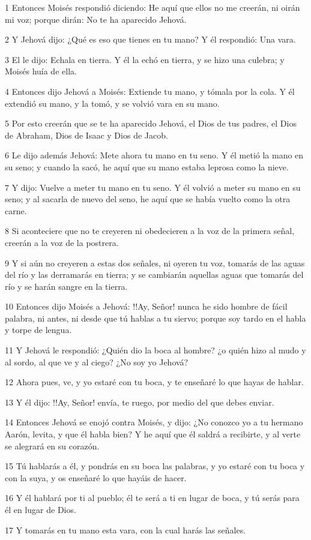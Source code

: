 \par 1 Entonces Moisés respondió diciendo: He aquí que ellos no me creerán, ni oirán mi voz; porque dirán: No te ha aparecido Jehová.
\par 2 Y Jehová dijo: ¿Qué es eso que tienes en tu mano? Y él respondió: Una vara.
\par 3 El le dijo: Echala en tierra. Y él la echó en tierra, y se hizo una culebra; y Moisés huía de ella.
\par 4 Entonces dijo Jehová a Moisés: Extiende tu mano, y tómala por la cola. Y él extendió su mano, y la tomó, y se volvió vara en su mano.
\par 5 Por esto creerán que se te ha aparecido Jehová, el Dios de tus padres, el Dios de Abraham, Dios de Isaac y Dios de Jacob.
\par 6 Le dijo además Jehová: Mete ahora tu mano en tu seno. Y él metió la mano en su seno; y cuando la sacó, he aquí que su mano estaba leprosa como la nieve.
\par 7 Y dijo: Vuelve a meter tu mano en tu seno. Y él volvió a meter su mano en su seno; y al sacarla de nuevo del seno, he aquí que se había vuelto como la otra carne.
\par 8 Si aconteciere que no te creyeren ni obedecieren a la voz de la primera señal, creerán a la voz de la postrera.
\par 9 Y si aún no creyeren a estas dos señales, ni oyeren tu voz, tomarás de las aguas del río y las derramarás en tierra; y se cambiarán aquellas aguas que tomarás del río y se harán sangre en la tierra.
\par 10 Entonces dijo Moisés a Jehová: !!Ay, Señor! nunca he sido hombre de fácil palabra, ni antes, ni desde que tú hablas a tu siervo; porque soy tardo en el habla y torpe de lengua.
\par 11 Y Jehová le respondió: ¿Quién dio la boca al hombre? ¿o quién hizo al mudo y al sordo, al que ve y al ciego? ¿No soy yo Jehová?
\par 12 Ahora pues, ve, y yo estaré con tu boca, y te enseñaré lo que hayas de hablar.
\par 13 Y él dijo: !!Ay, Señor! envía, te ruego, por medio del que debes enviar.
\par 14 Entonces Jehová se enojó contra Moisés, y dijo: ¿No conozco yo a tu hermano Aarón, levita, y que él habla bien? Y he aquí que él saldrá a recibirte, y al verte se alegrará en su corazón.
\par 15 Tú hablarás a él, y pondrás en su boca las palabras, y yo estaré con tu boca y con la suya, y os enseñaré lo que hayáis de hacer.
\par 16 Y él hablará por ti al pueblo; él te será a ti en lugar de boca, y tú serás para él en lugar de Dios.
\par 17 Y tomarás en tu mano esta vara, con la cual harás las señales.

